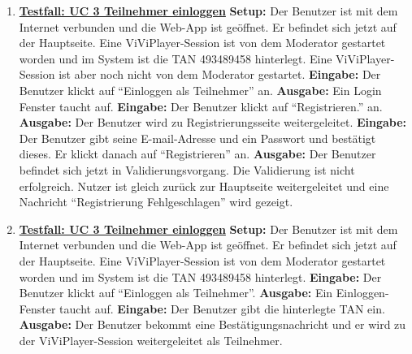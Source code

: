 \begin{enumerate}
	\item \underline{\textbf{Testfall: UC 3 Teilnehmer einloggen}} \linebreak
	\textbf{Setup:} Der Benutzer ist mit dem Internet verbunden und die Web-App ist geöffnet. Er befindet sich jetzt auf der Hauptseite. Eine ViViPlayer-Session ist von dem Moderator gestartet worden und im System ist die TAN 493489458 hinterlegt.
	Eine ViViPlayer-Session ist aber noch nicht von dem Moderator gestartet. \linebreak
	\textbf{Eingabe:} Der Benutzer klickt auf ``Einloggen als Teilnehmer'' an. \linebreak
	\textbf{Ausgabe:} Ein Login Fenster taucht auf. \linebreak
	\textbf{Eingabe:} Der Benutzer klickt auf ``Registrieren.'' an.\linebreak
	\textbf{Ausgabe:} Der Benutzer wird zu Registrierungsseite weitergeleitet.\linebreak
	\textbf{Eingabe:} Der Benutzer gibt seine E-mail-Adresse und ein Passwort und bestätigt dieses. Er klickt danach auf ``Registrieren'' an. \linebreak
	\textbf{Ausgabe:} Der Benutzer befindet sich jetzt in Validierungsvorgang. Die Validierung ist nicht erfolgreich. Nutzer ist gleich zurück zur Hauptseite weitergeleitet und eine Nachricht ``Registrierung Fehlgeschlagen'' wird gezeigt. \linebreak
	
	\item \underline{\textbf{Testfall: UC 3 Teilnehmer einloggen}} \linebreak
	\textbf{Setup:} Der Benutzer ist mit dem Internet verbunden und die Web-App ist geöffnet. Er befindet sich jetzt auf der Hauptseite. Eine ViViPlayer-Session ist von dem Moderator gestartet worden und im System ist die TAN 493489458 hinterlegt. \linebreak
	\textbf{Eingabe:} Der Benutzer klickt auf ``Einloggen als Teilnehmer''. \linebreak
	\textbf{Ausgabe:} Ein Einloggen-Fenster taucht auf. \linebreak
	\textbf{Eingabe:} Der Benutzer gibt die hinterlegte TAN ein. \linebreak
	\textbf{Ausgabe:} Der Benutzer bekommt eine Bestätigungsnachricht und er wird zu der ViViPlayer-Session weitergeleitet als Teilnehmer.\linebreak \linebreak \linebreak \linebreak


\end{enumerate}
